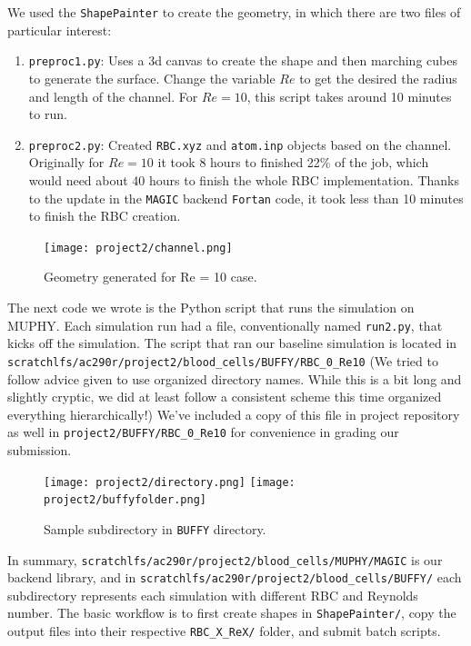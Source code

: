 \documentclass[11pt]{article} %
\newcommand{\tty}[1]{\texttt{#1}}
\begin{document}
We used the \texttt{ShapePainter} to create the geometry, in which there are two files of particular interest:
    \begin{enumerate}
        \item \texttt{preproc1.py}: Uses a 3d canvas to create the shape and then marching cubes to generate the surface. Change the variable $Re$ to get the desired the radius and length of the channel. For $Re=10$, this script takes around 10 minutes to run.
        \item \texttt{preproc2.py}: Created \texttt{RBC.xyz} and \texttt{atom.inp} objects based on the channel. Originally for $Re=10$ it took 8 hours to finished 22\% of the job, which would need about 40 hours to finish the whole RBC implementation. Thanks to the update in the \texttt{MAGIC} backend \texttt{Fortan} code, it took less than 10 minutes to finish the RBC creation.
    \end{enumerate}
    
\begin{figure}[H]
    \centering
    \texttt{[image: project2/channel.png]}
    \caption{Geometry generated for Re = 10 case.}
    \label{fig:my_label}
\end{figure}

The next code we wrote is the Python script that runs the simulation on MUPHY.
Each simulation run had a file, conventionally named \tty{run2.py}, that kicks off the simulation.  
The script that ran our baseline simulation is located in 
\tty{scratchlfs/ac290r/project2/blood\_cells/BUFFY/RBC\_0\_Re10}
(We tried to follow advice given to use organized directory names.
While this is a bit long and slightly cryptic, we did at least follow a consistent scheme
this time organized everything hierarchically!)
We've included a copy of this file in project repository as well in
\tty{project2/BUFFY/RBC\_0\_Re10} for convenience in grading our submission.
\begin{figure}[h!]
    \centering
    \texttt{[image: project2/directory.png]}
    \texttt{[image: project2/buffyfolder.png]}
    \caption{Sample subdirectory in \tty{BUFFY} directory.}
    \label{fig:my_label}
\end{figure}

In summary, \tty{scratchlfs/ac290r/project2/blood\_cells/MUPHY/MAGIC} is our backend library, and in \tty{scratchlfs/ac290r/project2/blood\_cells/BUFFY/} each subdirectory represents each simulation with different RBC and Reynolds number. The basic workflow is to first create shapes in \tty{ShapePainter/}, copy the output files into their respective \tty{RBC\_X\_ReX/} folder, and submit batch scripts.
\end{document}
